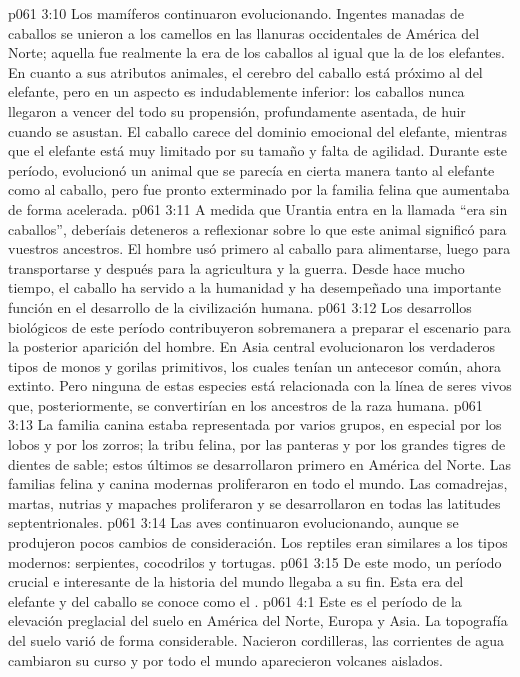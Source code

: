 \vs p061 3:10 Los mamíferos continuaron evolucionando. Ingentes manadas de caballos se unieron a los camellos en las llanuras occidentales de América del Norte; aquella fue realmente la era de los caballos al igual que la de los elefantes. En cuanto a sus atributos animales, el cerebro del caballo está próximo al del elefante, pero en un aspecto es indudablemente inferior: los caballos nunca llegaron a vencer del todo su propensión, profundamente asentada, de huir cuando se asustan. El caballo carece del dominio emocional del elefante, mientras que el elefante está muy limitado por su tamaño y falta de agilidad. Durante este período, evolucionó un animal que se parecía en cierta manera tanto al elefante como al caballo, pero fue pronto exterminado por la familia felina que aumentaba de forma acelerada.
\vs p061 3:11 \pc A medida que Urantia entra en la llamada “era sin caballos”, deberíais deteneros a reflexionar sobre lo que este animal significó para vuestros ancestros. El hombre usó primero al caballo para alimentarse, luego para transportarse y después para la agricultura y la guerra. Desde hace mucho tiempo, el caballo ha servido a la humanidad y ha desempeñado una importante función en el desarrollo de la civilización humana.
\vs p061 3:12 \pc Los desarrollos biológicos de este período contribuyeron sobremanera a preparar el escenario para la posterior aparición del hombre. En Asia central evolucionaron los verdaderos tipos de monos y gorilas primitivos, los cuales tenían un antecesor común, ahora extinto. Pero ninguna de estas especies está relacionada con la línea de seres vivos que, posteriormente, se convertirían en los ancestros de la raza humana.
\vs p061 3:13 La familia canina estaba representada por varios grupos, en especial por los lobos y por los zorros; la tribu felina, por las panteras y por los grandes tigres de dientes de sable; estos últimos se desarrollaron primero en América del Norte. Las familias felina y canina modernas proliferaron en todo el mundo. Las comadrejas, martas, nutrias y mapaches proliferaron y se desarrollaron en todas las latitudes septentrionales.
\vs p061 3:14 Las aves continuaron evolucionando, aunque se produjeron pocos cambios de consideración. Los reptiles eran similares a los tipos modernos: serpientes, cocodrilos y tortugas.
\vs p061 3:15 \pc De este modo, un período crucial e interesante de la historia del mundo llegaba a su fin. Esta era del elefante y del caballo se conoce como el .
\vs p061 4:1 Este es el período de la elevación preglacial del suelo en América del Norte, Europa y Asia. La topografía del suelo varió de forma considerable. Nacieron cordilleras, las corrientes de agua cambiaron su curso y por todo el mundo aparecieron volcanes aislados.
